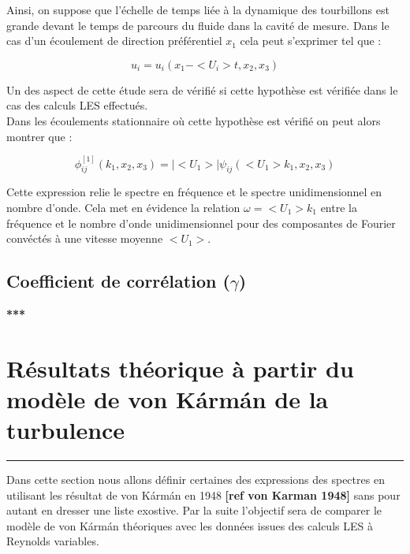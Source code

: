 \documentclass[12pt]{article}
\theoremstyle{plain}
\theoremstyle{remark}
\begin{document}
		Ainsi, on suppose que l'échelle de temps liée à la dynamique des tourbillons est grande devant le temps de parcours du fluide dans la cavité de mesure. Dans le cas d'un écoulement de direction préférentiel $x_1$ cela peut s'exprimer tel que :
		
		\begin{equation}
			u_i=u_i(x_1-<U_i>t,x_2,x_3)
		\end{equation}
	
		Un des aspect de cette étude sera de vérifié si cette hypothèse est vérifiée dans le cas des calculs LES effectués. \\
		
		Dans les écoulements stationnaire où cette hypothèse est vérifié on peut alors montrer que :
		
		\begin{equation}
			\phi_{ij}^{[1]}(k_1,x_2,x_3)=|<U_1>|\psi_{ij}(<U_1>k_1,x_2,x_3)
			\label{fig:turb-fig}
		\end{equation}
	
		Cette expression relie le spectre en fréquence et le spectre unidimensionnel en nombre d'onde. Cela met en évidence la relation $\omega=<U_1>k_1$ entre la fréquence et le nombre d'onde unidimensionnel pour des composantes de Fourier convéctés à une vitesse moyenne $<U_1>$. 
		
		\subsection{Coefficient de corrélation ($\gamma$)}
		
		
\begin{center}
	\large {\bf{***}}
\end{center}

\vspace{0.3cm}
\section{Résultats théorique à partir du modèle de von Kármán de la turbulence}
\noindent\rule{\linewidth}{2pt}
\vspace{0.1cm}
		
	Dans cette section nous allons définir certaines des expressions des spectres en utilisant les résultat de von Kármán en 1948 \textbf{[\color{blue}ref von Karman 1948]} sans pour autant en dresser une liste exostive. Par la suite l'objectif sera de comparer le modèle de von Kármán théoriques avec les données issues des calculs LES à Reynolds variables. \\
	
\end{document}
